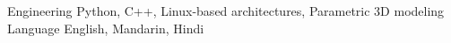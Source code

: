 

\begin{cvskills}

  \cvskill
    { Engineering}      { Python, C++, Linux-based architectures, Parametric 3D modeling}
  \cvskill
    {Language}          { English, Mandarin, Hindi} %


\end{cvskills}